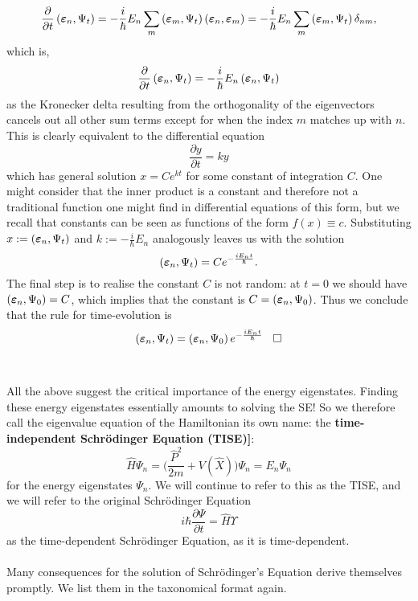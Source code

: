 $$
\frac{\partial}{\partial t}\left(\bm{\varepsilon}_{n},\Psi_{t}\right)=-\frac{i}{\hbar}E_{n}\sum_{m}\left(\bm{\varepsilon}_{m},\Psi_{t}\right)\left(\bm{\varepsilon}_{n},\bm{\varepsilon}_{m}\right)=-\frac{i}{\hbar}E_{n}\sum_{m}\left(\bm{\varepsilon}_{m},\Psi_{t}\right)\delta_{nm},
$$
which is,
$$
\frac{\partial}{\partial t}\left(\bm{\varepsilon}_{n},\Psi_{t}\right)=-\frac{i}{\hbar}E_{n}\left(\bm{\varepsilon}_{n},\Psi_{t}\right)
$$
as the Kronecker delta resulting from the orthogonality of the eigenvectors cancels out all other sum terms except for when the index $m$ matches up with $n$. This is clearly equivalent to the differential equation
$$
\frac{\partial y}{\partial t}=ky
$$
which has general solution $x=Ce^{kt}$ for some constant of integration $C$. One might consider that the inner product is a constant and therefore not a traditional function one might find in differential equations of this form, but we recall that constants can be seen as functions of the form $f(x)\equiv c$. Substituting $x:=\left(\bm{\varepsilon}_{n},\Psi_{t}\right)$ and $k:=-\frac{i}{\hbar}E_{n}$ analogously leaves us with the solution
$$
\left(\bm{\varepsilon}_{n},\Psi_{t}\right)=Ce^{-\frac{iE_{n}t}{\hbar}}.
$$
The final step is to realise the constant $C$ is not random: at $t=0$ we should have $\left(\bm{\varepsilon}_{n},\Psi_{0}\right)=C$, which implies that the constant is $C=\left(\bm{\varepsilon}_{n},\Psi_{0}\right)$. Thus we conclude that the rule for time-evolution is 
$$
\left(\bm{\varepsilon}_{n},\Psi_{t}\right)=\left(\bm{\varepsilon}_{n},\Psi_{0}\right)e^{-\frac{iE_{n}t}{\hbar}} \:\:\:\:\square
$$
\\\\
All the above suggest the critical importance of the energy eigenstates. Finding these energy eigenstates essentially amounts to solving the SE! So we therefore call the eigenvalue equation of the Hamiltonian its own name: the \textbf{time-independent Schr\"{o}dinger Equation (TISE)]}:
$$
\hat{H}\Psi_{n}= \biggl(\frac{\hat{P}^2}{2m}+V(\hat{X})\biggr)\Psi_{n}=E_{n}\Psi_{n}
$$
for the energy eigenstates $\Psi_{n}$. We will continue to refer to this as the TISE, and we will refer to the original Schr\"{o}dinger Equation
$$
i\hbar \frac{\partial \Psi}{\partial t} = \hat{H}\Upsilon
$$
as the time-dependent Schr\"{o}dinger Equation, as it is time-dependent.
\\\\
Many consequences for the solution of Schr\"{o}dinger's Equation derive themselves promptly. We list them in the taxonomical format again.
\\
